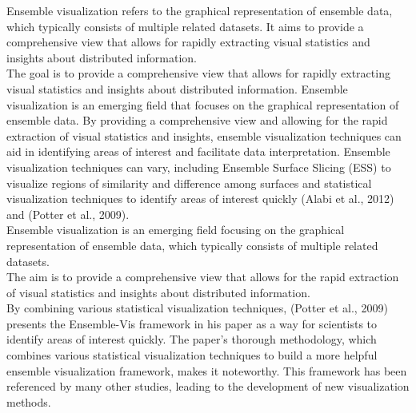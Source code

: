 \documentclass[print]{nuthesis}
\begin{document}
Ensemble visualization refers to the graphical representation of ensemble data, which typically consists of multiple related datasets.
It aims to provide a comprehensive view that allows for rapidly extracting visual statistics and insights about distributed information.\\
The goal is to provide a comprehensive view that allows for rapidly extracting visual statistics and insights about distributed information.
Ensemble visualization is an emerging field that focuses on the graphical representation of ensemble data.
By providing a comprehensive view and allowing for the rapid extraction of visual statistics and insights, ensemble visualization techniques can aid in identifying areas of interest and facilitate data interpretation.
Ensemble visualization techniques can vary, including Ensemble Surface Slicing (ESS) to visualize regions of similarity and difference among surfaces and statistical visualization techniques to identify areas of interest quickly (Alabi et al., 2012) and (Potter et al., 2009).\\
Ensemble visualization is an emerging field focusing on the graphical representation of ensemble data, which typically consists of multiple related datasets.\\
The aim is to provide a comprehensive view that allows for the rapid extraction of visual statistics and insights about distributed information.\\
By combining various statistical visualization techniques, (Potter et al., 2009) presents the Ensemble-Vis framework in his paper as a way for scientists to identify areas of interest quickly.
The paper's thorough methodology, which combines various statistical visualization techniques to build a more helpful ensemble visualization framework, makes it noteworthy.
This framework has been referenced by many other studies, leading to the development of new visualization methods.
\end{document}
